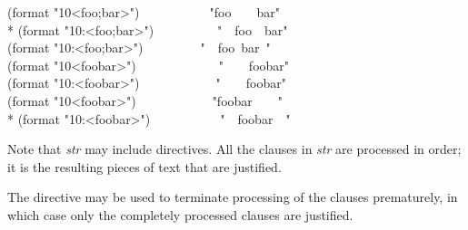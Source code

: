 \begin{flushdesc}
\begin{lisp}
(format {\false} "{\Xtilde}10<foo{\Xtilde};bar{\Xtilde}>")~~~~~~~~~~\EV\  "foo~~~~bar" \\*
(format {\false} "{\Xtilde}10:<foo{\Xtilde};bar{\Xtilde}>")~~~~~~~~~\EV\  "~~foo~~bar" \\
(format {\false} "{\Xtilde}10:{\Xatsign}<foo{\Xtilde};bar{\Xtilde}>")~~~~~~~~\EV\  "~~foo~bar~" \\
(format {\false} "{\Xtilde}10<foobar{\Xtilde}>")~~~~~~~~~~~~\EV\  "~~~~foobar" \\
(format {\false} "{\Xtilde}10:<foobar{\Xtilde}>")~~~~~~~~~~~\EV\  "~~~~foobar" \\
(format {\false} "{\Xtilde}10{\Xatsign}<foobar{\Xtilde}>")~~~~~~~~~~~\EV\  "foobar~~~~" \\*
(format {\false} "{\Xtilde}10:{\Xatsign}<foobar{\Xtilde}>")~~~~~~~~~~\EV\  "~~foobar~~"
\end{lisp}

Note that {\it str} may include  directives.
All the clauses in {\it str} are processed in order;
it is the resulting pieces of text that are justified.

The \cd{{\Xtilde}{\Xcircumflex}} directive may be used to terminate processing
of the clauses prematurely, in which case only the completely processed clauses
are justified.


\end{flushdesc}
